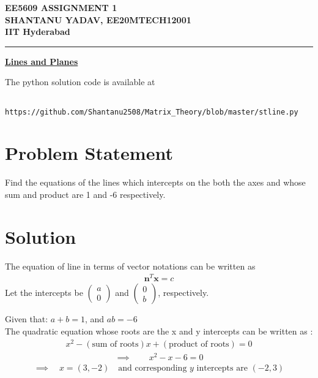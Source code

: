 \documentclass[12pt]{article}
\newcommand{\myvec}[1]{\ensuremath{\begin{pmatrix}#1\end{pmatrix}}} %
\begin{document}
\begin{center}
	{\large \bf EE5609 ASSIGNMENT 1} \\
	\vspace{2ex}
	{\large \bf SHANTANU YADAV, EE20MTECH12001 }\\
	{\Large \bf IIT Hyderabad} \\ \vspace{2ex}
\end{center}
	\hrule

\vspace{2ex}
\begin{center}
{\underline{\Large \bf Lines and Planes}}
\end{center}

\noindent 
The python solution code is available at
\begin{lstlisting}
	https://github.com/Shantanu2508/Matrix_Theory/blob/master/stline.py
\end{lstlisting}

\section*{Problem Statement}
Find the equations of the lines which intercepts on the both the axes and whose sum and product are 1 and -6 respectively.

\section*{Solution}
The equation of line in terms of vector notations can be written as
\begin{align}
	{\mathbf{n}^T}{\mathbf x} = c  
\end{align}
Let the intercepts be $\myvec{a \\ 0}$ and $\myvec{0 \\ b}$, respectively.

\noindent
Given that: \qquad \quad $ a + b = 1 $, \qquad and \qquad \quad $ ab = -6$ \\
The quadratic equation whose roots are the x and y intercepts can be written 
as :
\begin{align*}
	x^2 - (\text{sum of roots})x + (\text{product of roots}) = 0
\end{align*}
\begin{align}
	\implies \qquad x^2 - x -6 =0
\end{align}
\begin{align*}
\implies \quad x=(3,-2) \quad \text{and corresponding $y$ intercepts are  } (-2,3)
\end{align*}
\end{document}
